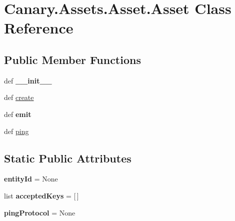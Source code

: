 \hypertarget{class_canary_8_assets_1_1_asset_1_1_asset}{\section{Canary.\-Assets.\-Asset.\-Asset Class Reference}
\label{class_canary_8_assets_1_1_asset_1_1_asset}
}
\subsection*{Public Member Functions}
\begin{DoxyCompactItemize}
\item 
\hypertarget{class_canary_8_assets_1_1_asset_1_1_asset_a0998d61e79eb4a4347b387b1049c3e15}{def {\bfseries \-\_\-\-\_\-init\-\_\-\-\_\-}}\label{class_canary_8_assets_1_1_asset_1_1_asset_a0998d61e79eb4a4347b387b1049c3e15}

\item 
def \hyperlink{class_canary_8_assets_1_1_asset_1_1_asset_a918c44ef466dec9539657e1892ff6ff8}{create}
\item 
\hypertarget{class_canary_8_assets_1_1_asset_1_1_asset_a4c1b60924e9dd994768d43dd0d23f56d}{def {\bfseries emit}}\label{class_canary_8_assets_1_1_asset_1_1_asset_a4c1b60924e9dd994768d43dd0d23f56d}

\item 
def \hyperlink{class_canary_8_assets_1_1_asset_1_1_asset_a2865c8c61ef6b24bb6979aaead066185}{ping}
\end{DoxyCompactItemize}
\subsection*{Static Public Attributes}
\begin{DoxyCompactItemize}
\item 
\hypertarget{class_canary_8_assets_1_1_asset_1_1_asset_ae4a629f23ad69d10f55eb83045840139}{{\bfseries entity\-Id} = None}\label{class_canary_8_assets_1_1_asset_1_1_asset_ae4a629f23ad69d10f55eb83045840139}

\item 
\hypertarget{class_canary_8_assets_1_1_asset_1_1_asset_afaa7d00f6ec6b03464272a5dbc3d4845}{list {\bfseries accepted\-Keys} = \mbox{[}$\,$\mbox{]}}\label{class_canary_8_assets_1_1_asset_1_1_asset_afaa7d00f6ec6b03464272a5dbc3d4845}

\item 
\hypertarget{class_canary_8_assets_1_1_asset_1_1_asset_acb031130aead033add665d4abf303ea8}{{\bfseries ping\-Protocol} = None}\label{class_canary_8_assets_1_1_asset_1_1_asset_acb031130aead033add665d4abf303ea8}

\end{DoxyCompactItemize}


